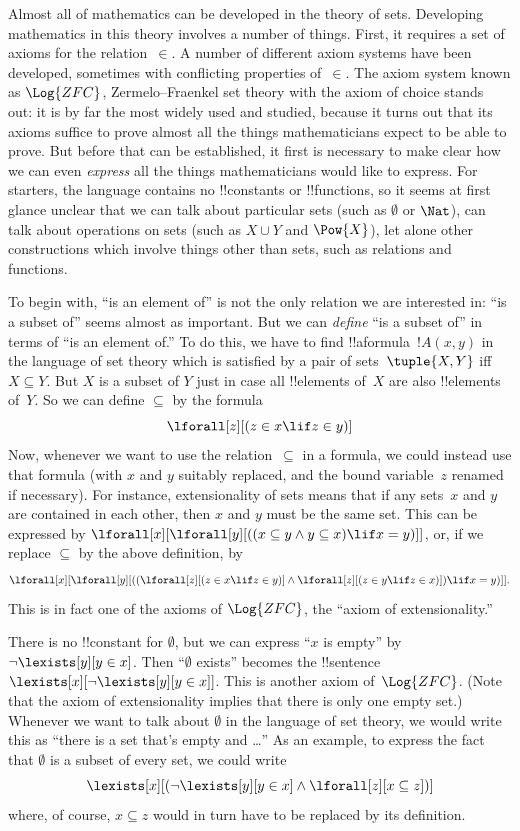 

Almost all of mathematics can be developed in the theory of sets.
Developing mathematics in this theory involves a number of things.
First, it requires a set of axioms for the relation~$\in$.  A number
of different axiom systems have been developed, sometimes with
conflicting properties of~$\in$.  The axiom system known as
$\Log{ZFC}$, Zermelo--Fraenkel set theory with the axiom of choice
stands out: it is by far the most widely used and studied, because it
turns out that its axioms suffice to prove almost all the things
mathematicians expect to be able to prove.  But before that can be
established, it first is necessary to make clear how we can even
\emph{express} all the things mathematicians would like to express.
For starters, the language contains no !!{constant}s or !!{function}s,
so it seems at first glance unclear that we can talk about particular
sets (such as $\emptyset$ or $\Nat$), can talk about operations on
sets (such as $X \cup Y$ and $\Pow{X}$), let alone other
constructions which involve things other than sets, such as relations
and functions.

To begin with, ``is an element of'' is not the only relation we are
interested in: ``is a subset of'' seems almost as important.  But we
can \emph{define} ``is a subset of'' in terms of ``is an element of.''
To do this, we have to find !!a{formula}~$!A(x, y)$ in
the language of set theory which is satisfied by a pair of
sets~$\tuple{X, Y}$ iff $X \subseteq Y$.  But $X$ is a subset of $Y$
just in case all !!{element}s of~$X$ are also !!{element}s of~$Y$.  So
we can define $\subseteq$ by the formula
\[
\lforall[z][(z \in x \lif z \in y)]
\]
Now, whenever we want to use the relation~$\subseteq$ in a formula, we
could instead use that formula (with $x$ and $y$ suitably replaced,
and the bound variable~$z$ renamed if necessary).  For instance,
extensionality of sets means that if any sets~$x$ and $y$ are
contained in each other, then $x$ and $y$ must be the same set. This
can be expressed by $\lforall[x][\lforall[y][((x \subseteq y \land y
    \subseteq x) \lif x = y)]]$, or, if we replace $\subseteq$ by the
above definition, by
\[
\lforall[x][\lforall[y][((\lforall[z][(z \in x \lif z \in y)] \land
    \lforall[z][(z \in y \lif z \in x)]) \lif x = y)]].
\]
This is in fact one of the axioms of $\Log{ZFC}$, the ``axiom of
extensionality.''

There is no !!{constant} for $\emptyset$, but we can express ``$x$ is
empty'' by $\lnot \lexists[y][y \in x]$.  Then ``$\emptyset$ exists''
becomes the !!{sentence}~$\lexists[x][\lnot \lexists[y][y \in
    x]]$. This is another axiom of~$\Log{ZFC}$.  (Note that the axiom
of extensionality implies that there is only one empty set.)  Whenever
we want to talk about $\emptyset$ in the language of set theory, we
would write this as ``there is a set that's empty and \dots'' As an
example, to express the fact that $\emptyset$ is a subset of every
set, we could write
\[
\lexists[x][(\lnot\lexists[y][y \in x] \land \lforall[z][x \subseteq
    z])]
\]
where, of course, $x \subseteq z$ would in turn have to be replaced by
its definition.

